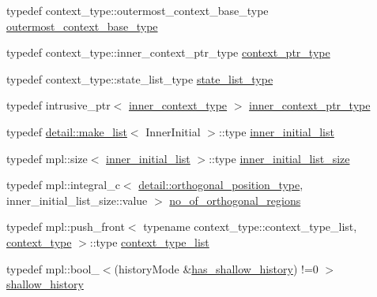\begin{DoxyCompactItemize}
\item 
typedef context\+\_\+type\+::outermost\+\_\+context\+\_\+base\+\_\+type \mbox{\hyperlink{classboost_1_1statechart_1_1simple__state_a50f21d7a7d6632eb34430e74cbad3197}{outermost\+\_\+context\+\_\+base\+\_\+type}}
\item 
typedef context\+\_\+type\+::inner\+\_\+context\+\_\+ptr\+\_\+type \mbox{\hyperlink{classboost_1_1statechart_1_1simple__state_ac7e361322d53b3f57976ff23056b59e7}{context\+\_\+ptr\+\_\+type}}
\item 
typedef context\+\_\+type\+::state\+\_\+list\+\_\+type \mbox{\hyperlink{classboost_1_1statechart_1_1simple__state_a20858144ca2f7a2ce2965badb92ebdc3}{state\+\_\+list\+\_\+type}}
\item 
typedef intrusive\+\_\+ptr$<$ \mbox{\hyperlink{classboost_1_1statechart_1_1simple__state_a2474f5eb168d48615fa1db224653457a}{inner\+\_\+context\+\_\+type}} $>$ \mbox{\hyperlink{classboost_1_1statechart_1_1simple__state_ad6d3233a11a23e91b4cc9edcae799379}{inner\+\_\+context\+\_\+ptr\+\_\+type}}
\item 
typedef \mbox{\hyperlink{structboost_1_1statechart_1_1detail_1_1make__list}{detail\+::make\+\_\+list}}$<$ Inner\+Initial $>$\+::type \mbox{\hyperlink{classboost_1_1statechart_1_1simple__state_ae86cab19f07d10cd8e46937fd243d4ba}{inner\+\_\+initial\+\_\+list}}
\item 
typedef mpl\+::size$<$ \mbox{\hyperlink{classboost_1_1statechart_1_1simple__state_ae86cab19f07d10cd8e46937fd243d4ba}{inner\+\_\+initial\+\_\+list}} $>$\+::type \mbox{\hyperlink{classboost_1_1statechart_1_1simple__state_ad853d83a11c3ad24de964badf9ba95cb}{inner\+\_\+initial\+\_\+list\+\_\+size}}
\item 
typedef mpl\+::integral\+\_\+c$<$ \mbox{\hyperlink{namespaceboost_1_1statechart_1_1detail_a3bedea0b807a16fa222733417183d2c9}{detail\+::orthogonal\+\_\+position\+\_\+type}}, inner\+\_\+initial\+\_\+list\+\_\+size\+::value $>$ \mbox{\hyperlink{classboost_1_1statechart_1_1simple__state_abee09a2cb17ed7db5457d3f09bb75f9c}{no\+\_\+of\+\_\+orthogonal\+\_\+regions}}
\item 
typedef mpl\+::push\+\_\+front$<$ typename context\+\_\+type\+::context\+\_\+type\+\_\+list, \mbox{\hyperlink{classboost_1_1statechart_1_1simple__state_ac053eaa9e1b0e3ccbf2231786cd651c4}{context\+\_\+type}} $>$\+::type \mbox{\hyperlink{classboost_1_1statechart_1_1simple__state_acb5e762119ffe2d44516c0f812d6cb65}{context\+\_\+type\+\_\+list}}
\item 
typedef mpl\+::bool\+\_\+$<$(history\+Mode \&\mbox{\hyperlink{namespaceboost_1_1statechart_a9c4ec64d7a0422b8b9c97b489f731372a91f197dd8c8935ec1a9328dfc5f90b43}{has\+\_\+shallow\+\_\+history}}) !=0 $>$ \mbox{\hyperlink{classboost_1_1statechart_1_1simple__state_a7bd6892fa9ec93f9d1384e00c468353d}{shallow\+\_\+history}}

\end{DoxyCompactItemize}
